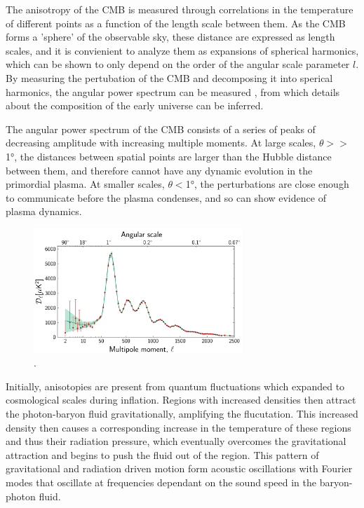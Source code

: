 The anisotropy of the CMB is measured through correlations in the temperature of different points as a function of the length scale between them. 
As the CMB forms a 'sphere' of the observable sky, these distance are expressed as length scales, and it is convienient to analyze them as expansions of spherical harmonics, which can be shown to only depend on the order of the angular scale parameter $l$. 
By measuring the pertubation of the CMB and decomposing it into sperical harmonics, the angular power spectrum can be measured , from which details about the composition of the early universe can be inferred.

The angular power spectrum of the CMB consists of a series of peaks of decreasing amplitude with increasing multiple moments. 
At large scales, $\theta >> $\ang{1}, the distances between spatial points are larger than the Hubble distance between them, and therefore cannot have any dynamic evolution in the primordial plasma.
At smaller scales, $\theta < $\ang{1}, the perturbations are close enough to communicate before the plasma condenses, and so can show evidence of plasma dynamics.

\begin{figure}
	\label{fig:CMBpowerSpectrum}
	\centering
	\includegraphics[width=0.7\textwidth]{figures/cmb_power_spectrum.png}
	\caption[The temperature angular power spectrum of the CMB]{\cite{PlanckCMB}.}
\end{figure}

Initially, anisotopies are present from quantum fluctuations which expanded to cosmological scales during inflation.
Regions with increased densities then attract the photon-baryon fluid gravitationally, amplifying the flucutation.
This increased density then causes a corresponding increase in the temperature of these regions and thus their radiation pressure, which eventually overcomes the gravitational attraction and begins to push the fluid out of the region. 
This pattern of gravitational and radiation driven motion form acoustic oscillations with Fourier modes that oscillate at frequencies dependant on the sound speed in the baryon-photon fluid.

